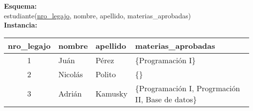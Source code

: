 \documentclass[preview]{standalone}
\begin{document}
\textbf{Esquema:}\\
estudiante(\underline{nro\_legajo}, nombre, apellido, materias\_aprobadas)\\

\textbf{Instancia:}
\begin{center}
\begin{tabular}{| c | l | l | l |}\hline			
	nro\_legajo & nombre & apellido & materias\_aprobadas \\\hline			
	1 & Ju\'an & P\'erez & \{\scriptsize{Programaci\'on I}\}\\
	2 & Nicol\'as & Polito & \{\}\\
	3 & Adri\'an & Kamusky & \{\scriptsize{Programaci\'on I, Progrmaci\'on II, Base de datos}\}\\\hline
\end{tabular}
\end{center}
\end{document}
